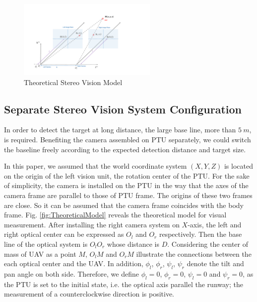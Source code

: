 \begin{figure}[!tb]
	\centering
	\includegraphics[width=0.6\textwidth]{figs/chp03_vision_20_basic_stereo.pdf}	
	\caption{Theoretical Stereo Vision Model}
	\label{fig:chp03_vision_20_basic_stereo}
\end{figure}

\subsection{Separate Stereo Vision System Configuration}
In order to detect the target at long distance, the large base line, more than $5\ m $, is required. Benefiting the camera assembled on PTU separately, we could switch the baseline freely according to the expected detection distance and target size.

In this paper, we assumed that the world coordinate system $(X, Y, Z)$ is located on the origin of the left vision unit, the rotation center of the PTU. For the sake of simplicity, the camera is installed on the PTU in the way that the axes of the camera frame are parallel to those of PTU frame. The origins of these two frames are close. So it can be assumed that the camera frame coincides with the body frame. Fig. \ref{fig:TheoreticalModel} reveals the theoretical model for visual measurement. After installing the right camera system on ${X}$-axis, the left and right optical center can be expressed as ${O_l}$ and ${O_r}$ respectively. Then the base line of the optical system is $O_lO_r$ whose distance is ${D}$. Considering the center of mass of UAV as a point ${M}$, ${O_lM}$ and ${O_rM}$ illustrate the connections between the each optical center and the UAV. In addition, ${\phi_l}$, ${\phi_r}$, ${\psi_l}$, ${\psi_r}$ denote the tilt and pan angle on both side. Therefore, we define $\phi_l= 0$, $\phi_r=0$, ${\psi_l=0}$ and ${\psi_r=0}$, as the PTU is set to the initial state, i.e. the optical axis parallel the runway; the measurement of a counterclockwise direction is positive.

